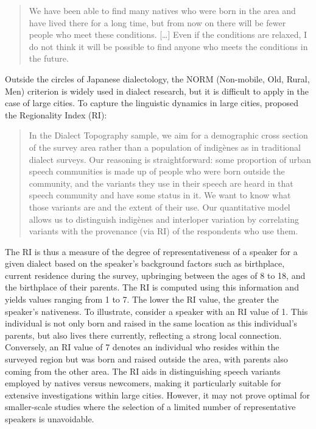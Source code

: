 \documentclass[output=paper,colorlinks,citecolor=brown]{langscibook}
\begin{document}
\begin{quote}
We have been able to find many natives who were born in the area and have lived there for a long time, but from now on there will be fewer people who meet these conditions. [\ldots] Even if the conditions are relaxed, I do not think it will be possible to find anyone who meets the conditions in the future.
\end{quote}

Outside the circles of Japanese dialectology, the NORM (Non-mobile, Old, Rural, Men) criterion is widely used in dialect research, but it is difficult to apply in the case of large cities. To capture the linguistic dynamics in large cities, \citet[40--46]{ChambersHeisler1999} proposed the Regionality Index (RI):

\begin{quote} 
In the Dialect Topography sample, we aim for a demographic cross section of the survey area rather than a population of indigènes as in traditional dialect surveys. Our reasoning is straightforward: some proportion of urban speech communities is made up of people who were born outside the community, and the variants they use in their speech are heard in that speech community and have some status in it. We want to know what those variants are and the extent of their use. Our quantitative model allows us to distinguish indigènes and interloper variation by correlating variants with the provenance (via RI) of the respondents who use them.
\end{quote}

The RI is thus a measure of the degree of representativeness of a speaker for a given dialect based on the speaker's background factors such as birthplace, current residence during the survey, upbringing between the ages of 8 to 18, and the birthplace of their parents. The RI is computed using this information and yields values ranging from 1 to 7. The lower the RI value, the greater the speaker's nativeness. To illustrate, consider a speaker with an RI value of 1. This individual is not only born and raised in the same location as this individual's parents, but also lives there currently, reflecting a strong local connection. Conversely, an RI value of 7 denotes an individual who resides within the surveyed region but was born and raised outside the area, with parents also coming from the other area. The RI aids in distinguishing speech variants employed by natives versus newcomers, making it particularly suitable for extensive investigations within large cities. However, it may not prove optimal for smaller-scale studies where the selection of a limited number of representative speakers is unavoidable.
\end{document}
